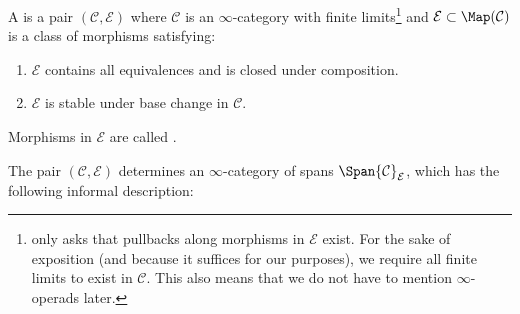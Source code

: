 \begin{defn}
A  is a pair $(\mathcal C, \mathcal E)$ where $\mathcal C$ is an $\infty$-category with finite limits\footnote{\cite{Mann2022} only asks that pullbacks along morphisms in $\mathcal E$ exist. For the sake of exposition (and because it suffices for our purposes), we require all finite limits to exist in $\mathcal C$. This also means that we do not have to mention $\infty$-operads later.} and $\mathcal E \subset \Map (\mathcal C)$ is a class of morphisms satisfying:
\begin{enumerate}[label=(\roman*)]
    \item $\mathcal E$ contains all equivalences and is closed under composition.
    \item $\mathcal E$ is stable under base change in $\mathcal C$.
\end{enumerate}
Morphisms in $\mathcal E$ are called . 
\end{defn}
The pair $(\mathcal C, \mathcal E)$ determines an $\infty$-category of spans $\Span{\mathcal C}_{\mathcal E}$, which has the following informal description:

